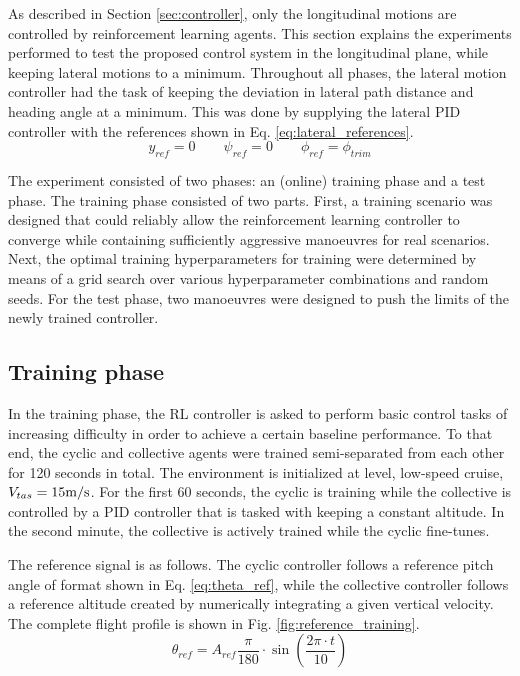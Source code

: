 As described in Section \ref{sec:controller}, only the longitudinal motions are controlled by reinforcement learning agents. This section explains the experiments performed to test the proposed control system in the longitudinal plane, while keeping lateral motions to a minimum. Throughout all phases, the lateral motion controller had the task of keeping the deviation in lateral path distance and heading angle at a minimum. This was done by supplying the lateral PID controller with the references shown in Eq. \eqref{eq:lateral_references}.
\begin{equation} \label{eq:lateral_references}
    y_{ref} = 0 \qquad \psi_{ref} = 0 \qquad \phi_{ref} = \phi_{trim}
\end{equation}

The experiment consisted of two phases: an (online) training phase and a test phase. The training phase consisted of two parts. First, a training scenario was designed that could reliably allow the reinforcement learning controller to converge while containing sufficiently aggressive manoeuvres for real scenarios. Next, the optimal training hyperparameters  for training were determined by means of a grid search over various hyperparameter combinations and random seeds. For the test phase, two manoeuvres were designed to push the limits of the newly trained controller. 

\subsection{Training phase} \label{ssec:trainingphase}

In the training phase, the RL controller is asked to perform basic control tasks of increasing difficulty in order to achieve a certain baseline performance. To that end, the cyclic and collective agents were trained semi-separated from each other for 120 seconds in total. The environment is initialized at level, low-speed cruise, $V_{tas} = 15\si[per-mode=symbol]{\meter \per \second}$. For the first 60 seconds, the cyclic is training while the collective is controlled by a PID controller that is tasked with keeping a constant altitude. In the second minute, the collective is actively trained while the cyclic fine-tunes. 

The reference signal is as follows. 
The cyclic controller follows a reference pitch angle of format shown in Eq. \eqref{eq:theta_ref}, while the collective controller follows a reference altitude created by numerically integrating a given vertical velocity. The complete flight profile is shown in Fig. \ref{fig:reference_training}. 
\begin{equation} \label{eq:theta_ref}
    \theta_{ref} = A_{ref} \frac{\pi}{180} \cdot \sin\left(\frac{2 \pi\cdot t}{10} \right)
\end{equation}

